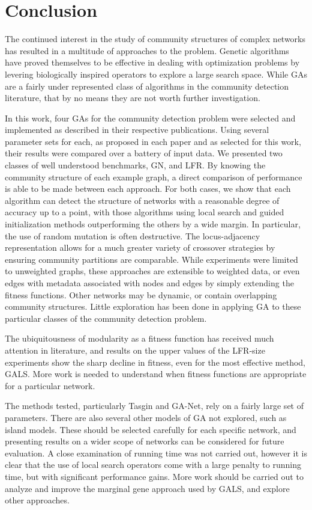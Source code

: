 \chapter{Conclusion}
\label{ch:conclusion}

The continued interest in the study of community structures of complex networks has resulted in a multitude of approaches to the problem. Genetic algorithms have proved themselves to be effective in dealing with optimization problems by levering biologically inspired operators to explore a large search space. While GAs are a fairly under represented class of algorithms in the community detection literature, that by no means they are not worth further investigation.

In this work, four GAs for the community detection problem were selected and implemented as described in their respective publications. Using several parameter sets for each, as proposed in each paper and as selected for this work, their results were compared over a battery of input data.
We presented two classes of well understood benchmarks, GN, and LFR. By knowing the community structure of each example graph, a direct comparison of performance is able to be made between each approach. For both cases, we show that each algorithm can detect the structure of networks with a reasonable degree of accuracy up to a point, with those algorithms using local search and guided initialization methods outperforming the others by a wide margin. In particular, the use of random mutation is often destructive. The locus-adjacency representation allows for a much greater variety of crossover strategies by ensuring community partitions are comparable. While experiments were limited to unweighted graphs, these approaches are extensible to weighted data, or even edges with metadata associated with nodes and edges by simply extending the fitness functions. Other networks may be dynamic, or contain overlapping community structures. Little exploration has been done in applying GA to these particular classes of the community detection problem.

The ubiquitousness of modularity as a fitness function has received much attention in literature, and results on the upper values of the LFR-size experiments show the sharp decline in fitness, even for the most effective method, GALS. More work is needed to understand when fitness functions are appropriate for a particular network.

The methods tested, particularly Tasgin and GA-Net, rely on a fairly large set of parameters. There are also several other models of GA not explored, such as island models. These should be selected carefully for each specific network, and presenting results on a wider scope of networks can be considered for future evaluation. A close examination of running time was not carried out, however it is clear that the use of local search operators come with a large penalty to running time, but with significant performance gains. More work should be carried out to analyze and improve the marginal gene approach used by GALS, and explore other approaches.